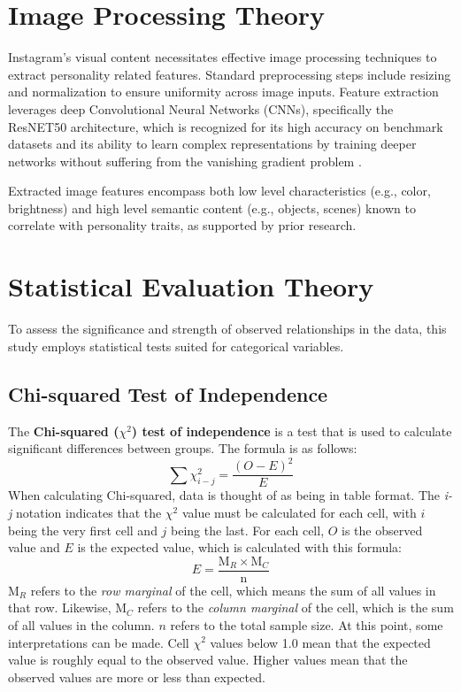 \section{Image Processing Theory}

Instagram's visual content necessitates effective image processing techniques to extract personality related features. Standard preprocessing steps include resizing and normalization to ensure uniformity across image inputs. Feature extraction leverages deep Convolutional Neural Networks (CNNs), specifically the ResNET50 architecture, which is recognized for its high accuracy on benchmark datasets and its ability to learn complex representations by training deeper networks without suffering from the vanishing gradient problem \citep{he2015}.

Extracted image features encompass both low level characteristics (e.g., color, brightness) and high level semantic content (e.g., objects, scenes) known to correlate with personality traits, as supported by prior research.

\section{Statistical Evaluation Theory}
To assess the significance and strength of observed relationships in the data, this study employs statistical tests suited for categorical variables.

\subsection{Chi-squared Test of Independence}
The \textbf{Chi-squared ($\chi^2$) test of independence} is a test that is used to calculate significant differences between groups. The formula is as follows:
$$\sum\chi^2_{i-j} = \frac{(O - E)^2}{E}$$
When calculating Chi-squared, data is thought of as being in table format. The \textit{i-j} notation indicates that the $\chi^2$ value must be calculated for each cell, with $i$ being the very first cell and $j$ being the last. For each cell, $O$ is the observed value and $E$ is the expected value, which is calculated with this formula:
$$E = \frac{ \text{M}_R  \times  \text{M}_C }{\text{n}}$$
$\text{M}_R$ refers to the \textit{row marginal} of the cell, which means the sum of all values in that row. Likewise, $\text{M}_C$ refers to the \textit{column marginal} of the cell, which is the sum of all values in the column. $n$ refers to the total sample size. At this point, some interpretations can be made. Cell $\chi^2$ values below 1.0 mean that the expected value is roughly equal to the observed value. Higher values mean that the observed values are more or less than expected.

